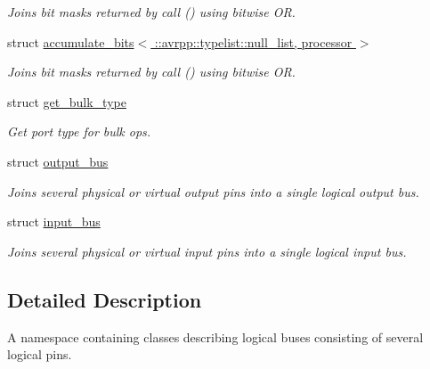 \begin{DoxyCompactItemize}
\begin{DoxyCompactList}\small\item\em Joins bit masks returned by call () using bitwise OR. \item\end{DoxyCompactList}\item 
struct \hyperlink{structavrpp_1_1bus_1_1accumulate__bits_3_01_1_1avrpp_1_1typelist_1_1null__list_00_01processor_01_4}{accumulate\_\-bits$<$ ::avrpp::typelist::null\_\-list, processor $>$}
\begin{DoxyCompactList}\small\item\em Joins bit masks returned by call () using bitwise OR. \item\end{DoxyCompactList}\item 
struct \hyperlink{structavrpp_1_1bus_1_1get__bulk__type}{get\_\-bulk\_\-type}
\begin{DoxyCompactList}\small\item\em Get port type for bulk ops. \item\end{DoxyCompactList}\item 
struct \hyperlink{structavrpp_1_1bus_1_1output__bus}{output\_\-bus}
\begin{DoxyCompactList}\small\item\em Joins several physical or virtual output pins into a single logical output bus. \item\end{DoxyCompactList}\item 
struct \hyperlink{structavrpp_1_1bus_1_1input__bus}{input\_\-bus}
\begin{DoxyCompactList}\small\item\em Joins several physical or virtual input pins into a single logical input bus. \item\end{DoxyCompactList}\end{DoxyCompactItemize}


\subsection{Detailed Description}
A namespace containing classes describing logical buses consisting of several logical pins. 